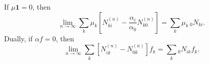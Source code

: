 If $\mu \mathbf{1} = 0$, then
$$\lim_{n \to \infty} \sum_k \mu_k \left[ N_{ki}^{(n)} - \frac{\alpha_i}{\alpha_0} N_{k0}^{(n)} \right] = \sum_k \mu_k \, {}_0 N_{ki}.$$
Dually, if $\alpha f = 0$, then
$$\lim_{n \to \infty} \sum_k \left[ N_{ik}^{(n)} - N_{0k}^{(n)} \right] f_k = \sum_k {}_0 N_{ik} f_k.$$
